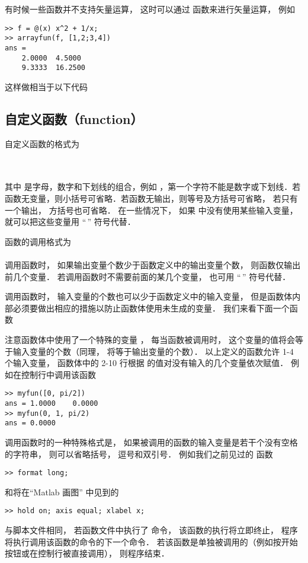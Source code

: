 有时候一些函数并不支持矢量运算， 这时可以通过  函数来进行矢量运算， 例如
\begin{lstlisting}[language=plain]
>> f = @(x) x^2 + 1/x;
>> arrayfun(f, [1,2;3,4])
ans =
    2.0000  4.5000
    9.3333  16.2500
\end{lstlisting}
这样做相当于以下代码


\subsection{自定义函数（function）}
自定义函数的格式为\\
\\
\\

其中  是字母，数字和下划线的组合，例如 ，第一个字符不能是数字或下划线．若函数无变量，则小括号可省略．若函数无输出，则等号及方括号可省略， 若只有一个输出， 方括号也可省略． 在一些情况下， 如果  中没有使用某些输入变量， 就可以把这些变量用 “\;\,\x{\~}” 符号代替．

函数的调用格式为\\
\\
调用函数时， 如果输出变量个数少于函数定义中的输出变量个数， 则函数仅输出前几个变量． 若调用函数时不需要前面的某几个变量， 也可用 “\;\,\x{\~}” 符号代替．

调用函数时， 输入变量的个数也可以少于函数定义中的输入变量， 但是函数体内部必须要做出相应的措施以防止函数体使用未生成的变量． 我们来看下面一个函数


注意函数体中使用了一个特殊的变量 ， 每当函数被调用时， 这个变量的值将会等于输入变量的个数（同理，  将等于输出变量的个数）． 以上定义的函数允许 1-4 个输入变量， 函数体中的 2-10 行根据  的值对没有输入的几个变量依次赋值． 例如在控制行中调用该函数
\begin{lstlisting}[language=plain]
>> myfun([0, pi/2])
ans = 1.0000    0.0000
>> myfun(0, 1, pi/2)
ans = 0.0000
\end{lstlisting}

调用函数时的一种特殊格式是， 如果被调用的函数的输入变量是若干个没有空格的字符串， 则可以省略括号， 逗号和双引号． 例如我们之前见过的  函数
\begin{lstlisting}[language=plain]
>> format long;
\end{lstlisting}
和将在“Matlab 画图” 中见到的
\begin{lstlisting}[language=plain]
>> hold on; axis equal; xlabel x;
\end{lstlisting}

与脚本文件相同， 若函数文件中执行了  命令， 该函数的执行将立即终止， 程序将执行调用该函数的命令的下一个命令． 若该函数是单独被调用的（例如按开始按钮或在控制行被直接调用）， 则程序结束．
